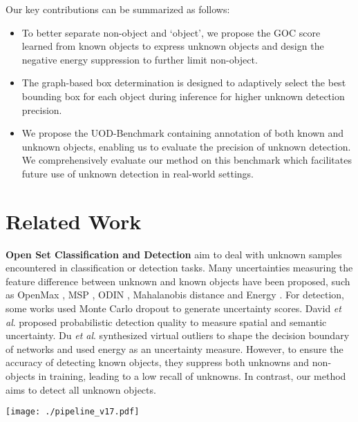 \documentclass[10pt,twocolumn,letterpaper]{article}
\newcommand{\xf}[1]{{\color{black} #1}}
\newcommand{\net}{UnSniffer\xspace}
\begin{document}
Our key contributions \xf{can be} summarized as follows:

\begin{itemize}
\item To better separate non-object and `object',
we propose the GOC score learned from known objects to express unknown objects and design the negative energy suppression to further limit non-object.

\item The graph-based box determination is designed to adaptively select the best bounding box for each object \xf{during} inference for higher unknown detection precision.

\item We propose the UOD-Benchmark containing annotation of both known and unknown objects,
enabling us to evaluate the precision of unknown detection.
We comprehensively evaluate our method on this benchmark which facilitates future use of unknown detection in real-world settings.
\end{itemize}


\section{Related Work}
\label{sec:relatedwork}

\noindent
\textbf{Open Set Classification and Detection} aim to deal with unknown samples encountered in classification or detection tasks.
Many uncertainties measuring the feature difference between unknown and known objects have been proposed,
such as OpenMax \cite{bendale2016towards}, MSP \cite{hendrycks2016baseline}, ODIN \cite{liang2017enhancing}, Mahalanobis distance \cite{denouden2018improving} and Energy \cite{liu2020energy}.
For detection, some works \cite{gal2016dropout, miller2018dropout, miller2019evaluating} used Monte Carlo dropout to generate uncertainty scores.
David \emph{et al}. \cite{hall2020probabilistic} proposed probabilistic detection quality to measure spatial and semantic uncertainty. Du \emph{et al}. \cite{vos, du2022unknown} synthesized virtual outliers to shape the decision boundary of networks and used energy as an uncertainty measure.
However,
to ensure the accuracy of detecting known objects,
they suppress both unknowns and non-objects in training,
leading to a low recall of unknowns.
In contrast,
our method aims to detect all unknown objects.


\begin{figure*}
\centering
\texttt{[image: ./pipeline\_v17.pdf]}
\vspace{-16pt}
\caption{
\textbf{The framework of \net}
contains a feature extractor, a known object detector and a generalized object detector.
(a) is the input RGB image.
(b) visualizes several channels of deep features encoding the known and unknown objects at the same time,
and the red circles mark the position of the objects.
(c) shows the GOC score's distribution before and after training the GOC.
(d) shows the negative energy's distribution before and after using negative energy suppression.
(e) is the result.
}
\vspace{-10pt}
\label{fig:pipeline}
\end{figure*}
\end{document}
